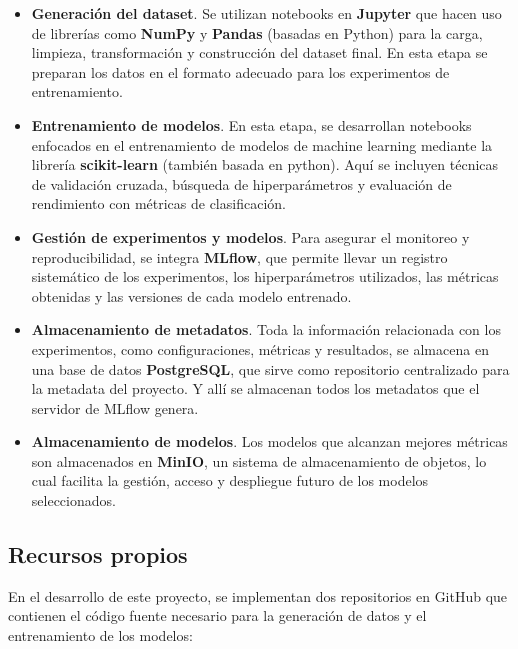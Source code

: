 \documentclass[11pt,a4paper,spanish]{book}
\numberwithin{equation}{chapter}
\numberwithin{figure}{chapter}
\begin{document}
\begin{itemize}

\item \textbf{Generación del dataset}. Se utilizan notebooks en \textbf{Jupyter} que 
hacen uso de librerías como \textbf{NumPy} y \textbf{Pandas} (basadas en Python) para 
la carga, limpieza, transformación y construcción del dataset final. En esta etapa se 
preparan los datos en el formato adecuado para los experimentos de entrenamiento.


\item \textbf{Entrenamiento de modelos}. En esta etapa, se desarrollan notebooks 
enfocados en el entrenamiento de modelos de machine learning mediante la librería 
\textbf{scikit-learn} (también basada en python). Aquí se incluyen técnicas de 
validación cruzada, búsqueda de hiperparámetros y evaluación de rendimiento con métricas
de clasificación.


\item \textbf{Gestión de experimentos y modelos}. Para asegurar el monitoreo y 
reproducibilidad, se integra \textbf{MLflow}, que permite llevar un registro 
sistemático de los experimentos, los hiperparámetros utilizados, las métricas obtenidas 
y las versiones de cada modelo entrenado.


\item \textbf{Almacenamiento de metadatos}.  Toda la información relacionada con los 
experimentos, como configuraciones, métricas y resultados, se almacena en una base de 
datos \textbf{PostgreSQL}, que sirve como repositorio centralizado para la metadata del 
proyecto. Y allí se almacenan todos los metadatos que el servidor de MLflow genera. 


\item \textbf{Almacenamiento de modelos}. Los modelos que alcanzan mejores métricas son 
almacenados en \textbf{MinIO}, un sistema de almacenamiento de objetos, lo cual facilita 
la gestión, acceso y despliegue futuro de los modelos seleccionados.

\end{itemize}


\subsection{Recursos propios}


En el desarrollo de este proyecto, se implementan dos repositorios en GitHub que 
contienen el código fuente necesario para la generación de datos y el entrenamiento de 
los modelos:
\end{document}
